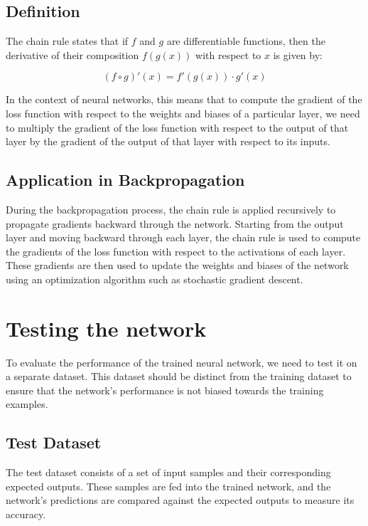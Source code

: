\documentclass{article}
\begin{document}
\subsection{Definition}

The chain rule states that if \( f \) and \( g \) are differentiable functions, then the derivative of their composition \( f(g(x)) \) with respect to \( x \) is given by:

\[
(f \circ g)'(x) = f'(g(x)) \cdot g'(x)
\]

In the context of neural networks, this means that to compute the gradient of the loss function with respect to the weights and biases of a particular layer, we need to multiply the gradient of the loss function with respect to the output of that layer by the gradient of the output of that layer with respect to its inputs.

\subsection{Application in Backpropagation}

During the backpropagation process, the chain rule is applied recursively to propagate gradients backward through the network. Starting from the output layer and moving backward through each layer, the chain rule is used to compute the gradients of the loss function with respect to the activations of each layer. These gradients are then used to update the weights and biases of the network using an optimization algorithm such as stochastic gradient descent.

\newpage
\section{Testing the network}
To evaluate the performance of the trained neural network, we need to test it on a separate dataset. This dataset should be distinct from the training dataset to ensure that the network's performance is not biased towards the training examples.

\subsection{Test Dataset}

The test dataset consists of a set of input samples and their corresponding expected outputs. These samples are fed into the trained network, and the network's predictions are compared against the expected outputs to measure its accuracy.
\end{document}
